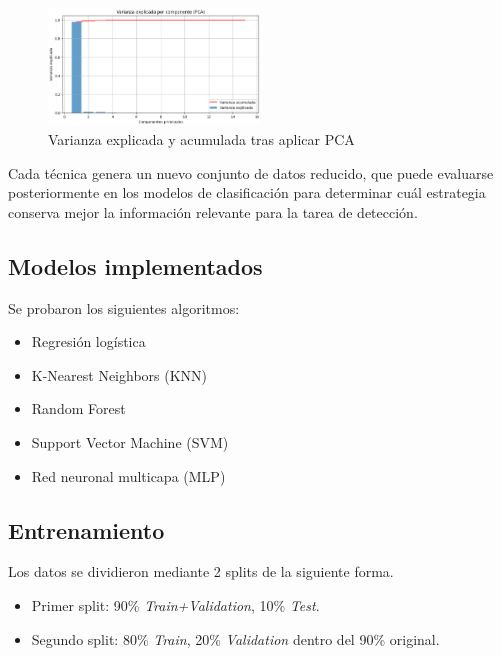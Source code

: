 \documentclass[conference]{IEEEtran}
\begin{document}
\begin{itemize}
    
    \begin{figure}[htbp]
    \centering
    \includegraphics[width=0.5\textwidth]{images/pca.png}
    \caption{Varianza explicada y acumulada tras aplicar PCA}
    \label{fig:pca}
    \end{figure}
    \end{itemize}

Cada técnica genera un nuevo conjunto de datos reducido, que puede evaluarse posteriormente en los modelos de clasificación para determinar cuál estrategia conserva mejor la información relevante para la tarea de detección.























\subsection{Modelos implementados}

Se probaron los siguientes algoritmos:
\begin{itemize}
    \item Regresión logística
    \item K-Nearest Neighbors (KNN)
    \item Random Forest
    \item Support Vector Machine (SVM)
    \item Red neuronal multicapa (MLP)
\end{itemize}


\subsection{Entrenamiento}


Los datos se dividieron mediante 2 splits de la siguiente forma. 
\begin{itemize}
    \item Primer split: 90\% \textit{Train+Validation}, 10\% \textit{Test}.
    \item Segundo split: 80\% \textit{Train}, 20\% \textit{Validation} dentro del 90\% original.
\end{itemize}
\end{document}
